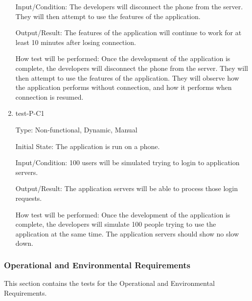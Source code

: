 \documentclass[12pt, titlepage]{article}
\begin{document}
\begin{enumerate}
Input/Condition: The developers will disconnect the phone from the server. They will then attempt to use the features of the application.
					
Output/Result: The features of the application will continue to work for at least 10 minutes after losing connection.
					
How test will be performed: Once the development of the application is complete, the developers will disconnect the phone from the server. They will then attempt to use the features of the application. They will observe how the application performs without connection, and how it performs when connection is resumed.

\item{test-P-C1\\}

Type: Non-functional, Dynamic, Manual 
					
Initial State: The application is run on a phone.
					
Input/Condition: 100 users will be simulated trying to login to application servers.
					
Output/Result: The application servers will be able to process those login requests.
					
How test will be performed: Once the development of the application is complete, the developers will simulate 100 people trying to use the application at the same time. The application servers should show no slow down.


\end{enumerate}

\subsubsection{Operational and Environmental Requirements}

This section contains the tests for the Operational and Environmental Requirements.
		
\end{document}

